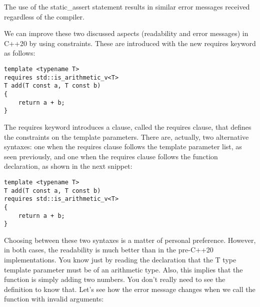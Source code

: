 The use of the static\_assert statement results in similar error messages received regardless of the compiler.

We can improve these two discussed aspects (readability and error messages) in C++20 by using constraints. These are introduced with the new requires keyword as follows:

\begin{lstlisting}[style=styleCXX]
template <typename T>
requires std::is_arithmetic_v<T>
T add(T const a, T const b)
{
	return a + b;
}
\end{lstlisting}

The requires keyword introduces a clause, called the requires clause, that defines the constraints on the template parameters. There are, actually, two alternative syntaxes: one when the requires clause follows the template parameter list, as seen previously, and one when the requires clause follows the function declaration, as shown in the next snippet:

\begin{lstlisting}[style=styleCXX]
template <typename T>
T add(T const a, T const b)
requires std::is_arithmetic_v<T>
{
	return a + b;
}
\end{lstlisting}

Choosing between these two syntaxes is a matter of personal preference. However, in both cases, the readability is much better than in the pre-C++20 implementations. You know just by reading the declaration that the T type template parameter must be of an arithmetic type. Also, this implies that the function is simply adding two numbers. You don’t really need to see the definition to know that. Let’s see how the error message changes when we call the function with invalid arguments:

